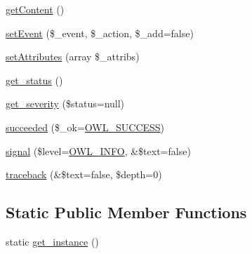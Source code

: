 \begin{DoxyCompactItemize}
\item 
\hyperlink{classBaseElement_af8c86b93bcdcfbc415bf96c622dc5516}{getContent} ()
\item 
\hyperlink{classBaseElement_ad5789f45f16aaa144716ee8558069c31}{setEvent} (\$\_\-event, \$\_\-action, \$\_\-add=false)
\item 
\hyperlink{classBaseElement_a7d8ddd64ceb3401a7cb84548656b3709}{setAttributes} (array \$\_\-attribs)
\item 
\hyperlink{class__OWL_a99ec771fa2c5c279f80152cc09e489a8}{get\_\-status} ()
\item 
\hyperlink{class__OWL_adf9509ef96858be7bdd9414c5ef129aa}{get\_\-severity} (\$status=null)
\item 
\hyperlink{class__OWL_ae76c46aff1ad253106332670fc59c777}{succeeded} (\$\_\-ok=\hyperlink{owl_8severitycodes_8php_a96223f06ba27bf5cbefa6e9d702897c2}{OWL\_\-SUCCESS})
\item 
\hyperlink{class__OWL_a51ba4a16409acf2a2f61f286939091a5}{signal} (\$level=\hyperlink{owl_8severitycodes_8php_a139328861128689f2f4def6a399d9057}{OWL\_\-INFO}, \&\$text=false)
\item 
\hyperlink{class__OWL_aa29547995d6741b7d2b90c1d4ea99a13}{traceback} (\&\$text=false, \$depth=0)
\end{DoxyCompactItemize}
\subsection*{Static Public Member Functions}
\begin{DoxyCompactItemize}
\item 
static \hyperlink{classDocument_a840881b31974bd6f307fd6dcf73bc9c3}{get\_\-instance} ()
\end{DoxyCompactItemize}
